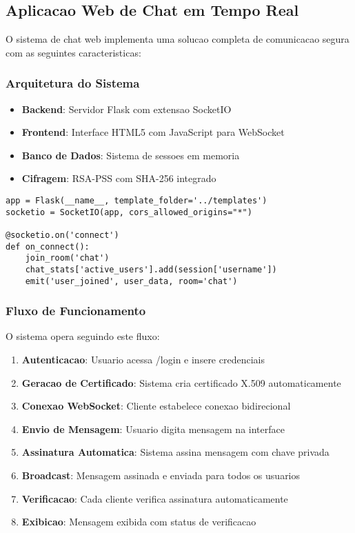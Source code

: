 \documentclass[12pt,a4paper,oneside]{article}
\begin{document}
\subsection{Aplicacao Web de Chat em Tempo Real}

O sistema de chat web implementa uma solucao completa de comunicacao segura com as seguintes caracteristicas:

\subsubsection{Arquitetura do Sistema}

\begin{itemize}
    \item \textbf{Backend}: Servidor Flask com extensao SocketIO
    \item \textbf{Frontend}: Interface HTML5 com JavaScript para WebSocket
    \item \textbf{Banco de Dados}: Sistema de sessoes em memoria
    \item \textbf{Cifragem}: RSA-PSS com SHA-256 integrado
\end{itemize}

\begin{lstlisting}[caption=Configuracao do servidor Flask com WebSocket]
app = Flask(__name__, template_folder='../templates')
socketio = SocketIO(app, cors_allowed_origins="*")

@socketio.on('connect')
def on_connect():
    join_room('chat')
    chat_stats['active_users'].add(session['username'])
    emit('user_joined', user_data, room='chat')
\end{lstlisting}

\subsubsection{Fluxo de Funcionamento}

O sistema opera seguindo este fluxo:

\begin{enumerate}
    \item \textbf{Autenticacao}: Usuario acessa /login e insere credenciais
    \item \textbf{Geracao de Certificado}: Sistema cria certificado X.509 automaticamente
    \item \textbf{Conexao WebSocket}: Cliente estabelece conexao bidirecional
    \item \textbf{Envio de Mensagem}: Usuario digita mensagem na interface
    \item \textbf{Assinatura Automatica}: Sistema assina mensagem com chave privada
    \item \textbf{Broadcast}: Mensagem assinada e enviada para todos os usuarios
    \item \textbf{Verificacao}: Cada cliente verifica assinatura automaticamente
    \item \textbf{Exibicao}: Mensagem exibida com status de verificacao
\end{enumerate}
\end{document}
